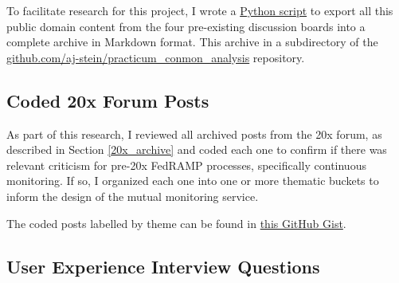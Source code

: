 \documentclass{jdf}
\begin{document}
To facilitate research for this project, I wrote a \href{https://github.com/aj-stein/practicum_conmon_analysis/blob/e0baba42dda242b137fa7ab583a3ceaecaf1e94f/src/download_discussions.py}{Python script} to export all this public domain content from the four pre-existing discussion boards into a complete archive in Markdown format. This archive in a subdirectory of the \href{https://github.com/aj-stein/practicum\_conmon\_analysis/tree/e0baba42dda242b137fa7ab583a3ceaecaf1e94f/data/fedramp}{github.com/aj-stein/practicum\_conmon\_analysis} repository.

\subsection{Coded 20x Forum Posts} \label{20x_archive_coded}

As part of this research, I reviewed all archived posts from the 20x forum, as described in Section \ref{20x_archive} and coded each one to confirm if there was relevant criticism for pre-20x FedRAMP processes, specifically continuous monitoring. If so, I organized each one into one or more thematic buckets to inform the design of the mutual monitoring service.

The coded posts labelled by theme can be found in \href{https://gist.github.com/aj-stein/ffa8bdbe5674a59159d4850aa16fb142}{this GitHub Gist}.

\subsection{User Experience Interview Questions} \label{questionnaire}
\end{document}
